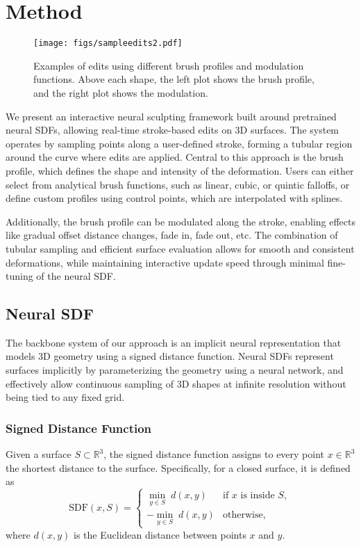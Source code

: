 
\section{Method}
\begin{figure}
  \centering
    \texttt{[image: figs/sampleedits2.pdf]}
    \caption{Examples of edits using different brush profiles and modulation functions. Above each shape, the left plot shows the brush profile, and the right plot shows the modulation.}
    \label{fig:vary}
  \vspace{-5pt}
\end{figure}

We present an interactive neural sculpting framework built around pretrained neural SDFs, allowing real-time stroke-based edits on 3D surfaces. The system operates by sampling points along a user-defined stroke, forming a tubular region around the curve where edits are applied. Central to this approach is the brush profile, which defines the shape and intensity of the deformation. Users can either select from analytical brush functions, such as linear, cubic, or quintic falloffs, or define custom profiles using control points, which are interpolated with splines.

Additionally, the brush profile can be modulated along the stroke, enabling effects like gradual offset distance changes, fade in, fade out, etc. The combination of tubular sampling and efficient surface evaluation allows for smooth and consistent deformations, while maintaining interactive update speed through minimal fine-tuning of the neural SDF.
\subsection{Neural SDF}
The backbone system of our approach is an implicit neural representation that models 3D geometry using a signed distance function. Neural SDFs represent surfaces implicitly by parameterizing the geometry using a neural network, and effectively allow continuous sampling of 3D shapes at infinite resolution without being tied to any fixed grid.

\subsubsection{Signed Distance Function}
Given a surface \( S \subset \mathbb{R}^3 \), the signed distance function assigns to every point \( x \in \mathbb{R}^3 \) the shortest distance to the surface. Specifically, for a closed surface, it is defined as
\begin{equation}
\text{SDF}(x, S) =
\begin{cases}
   \min_{y \in S} \; d(x, y) & \text{if } x \text{ is inside } S, \\
  - \min_{y \in S} \; d(x, y) & \text{otherwise},
\end{cases}
\end{equation}
where \( d(x, y) \) is the Euclidean distance between points \( x \) and \( y \).

